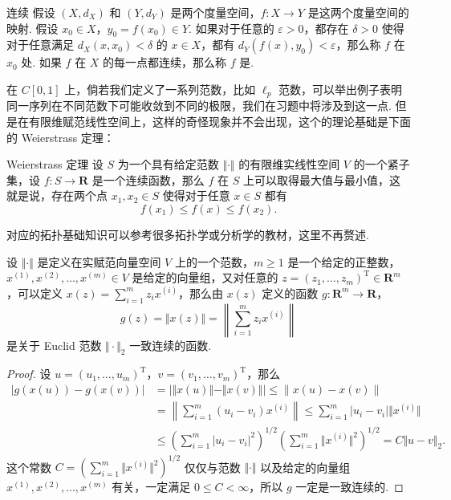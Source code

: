 \begin{definition}{连续}{}
    假设 $(X,d_X)$ 和 $(Y, d_Y)$ 是两个度量空间，$f\colon X\to Y$ 是这两个度量空间的映射. 假设 $x_0\in X$，$y_0 = f(x_0)\in Y$. 如果对于任意的 $\varepsilon>0$，都存在 $\delta>0$ 使得对于任意满足 $d_X(x, x_0) < \delta$ 的 $x\in X$，都有 $d_Y(f(x), y_0) < \varepsilon$，那么称 $f$ 在 $x_0$ 处. 如果 $f$ 在 $X$ 的每一点都连续，那么称 $f$ 是.
\end{definition}

在 $C[0, 1]$ 上，倘若我们定义了一系列范数，比如 $\ell_p$ 范数，可以举出例子表明同一序列在不同范数下可能收敛到不同的极限，我们在习题中将涉及到这一点. 但是在有限维赋范线性空间上，这样的奇怪现象并不会出现，这个的理论基础是下面的 Weierstrass 定理：

\begin{theorem}{Weierstrass 定理}{}
    设 $S$ 为一个具有给定范数 $\Vert \cdot \Vert$ 的有限维实线性空间 $V$ 的一个紧子集，设 $f\colon S\to\mathbf{R}$ 是一个连续函数，那么 $f$ 在 $S$ 上可以取得最大值与最小值，这就是说，存在两个点 $x_1, x_2\in S$ 使得对于任意 $x\in S$ 都有 \[f(x_1)\leqslant f(x)\leqslant f(x_2).\]
\end{theorem}

对应的拓扑基础知识可以参考很多拓扑学或分析学的教材，这里不再赘述.

\begin{lemma}{}{}
    设 $\Vert \cdot\Vert$ 是定义在实赋范向量空间 $V$ 上的一个范数，$m\geqslant 1$ 是一个给定的正整数，$x^{(1)}, x^{(2)}, \ldots, x^{(m)}\in V$ 是给定的向量组，又对任意的 $z = (z_1, \ldots, z_m)^\mathrm{T} \in \mathbf{R}^m$，可以定义 $x(z) = \sum\limits_{i=1}^{m}z_ix^{(i)}$，那么由 $x(z)$ 定义的函数 $g\colon \mathbf{R}^m\to \mathbf{R}$，
    \[g(z) = \Vert x(z)\Vert = \left\lVert \sum_{i=1}^{m}z_ix^{(i)}\right\rVert\] 是关于 Euclid 范数 $\Vert\cdot\Vert_2$ 一致连续的函数.
\end{lemma}

\begin{proof}
    设 $u = (u_1, \ldots, u_m)^\mathrm{T}$，$v = (v_1, \ldots, v_m)^\mathrm{T}$，那么
    \begin{align}
        \vert g(x(u)) - g(x(v))\vert
         & = \lvert \Vert x(u) \Vert - \Vert x(v) \Vert \rvert \leqslant \lVert x(u) - x(v)\rVert                                                           \\
         & = \left\lVert \sum_{i = 1}^{m} (u_i - v_i)x^{(i)}\right\rVert \leqslant \sum_{i = 1}^{m}\vert u_i - v_i\vert \Vert x^{(i)}\Vert                  \\
         & \leqslant \left(\sum_{i = 1}^{m}\vert u_i - v_i\vert^2\right)^{1/2}\left(\sum_{i = 1}^{m}\Vert x^{(i)}\Vert^2\right)^{1/2} =C\Vert u - v\Vert_2.
    \end{align}
    这个常数 $C = \left(\sum\limits_{i = 1}^{m}\Vert x^{(i)}\Vert^2\right)^{1/2}$ 仅仅与范数 $\Vert\cdot\Vert$ 以及给定的向量组 $x^{(1)}, x^{(2)}, \ldots, x^{(m)}$ 有关，一定满足 $0 \leqslant C<\infty$，所以 $g$ 一定是一致连续的.
\end{proof}

